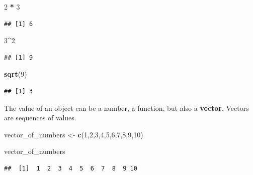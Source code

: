 \documentclass[
]{article}
\newenvironment{Shaded}{\begin{snugshade}}{\end{snugshade}}
\newcommand{\DecValTok}[1]{\textcolor[rgb]{0.00,0.00,0.81}{#1}}
\newcommand{\KeywordTok}[1]{\textcolor[rgb]{0.13,0.29,0.53}{\textbf{#1}}}
\newcommand{\NormalTok}[1]{#1}
\newcommand{\OperatorTok}[1]{\textcolor[rgb]{0.81,0.36,0.00}{\textbf{#1}}}
\newcommand{\StringTok}[1]{\textcolor[rgb]{0.31,0.60,0.02}{#1}}
\begin{document}
\begin{Shaded}
\begin{Highlighting}[]
\DecValTok{2} \OperatorTok{*}\StringTok{ }\DecValTok{3}
\end{Highlighting}
\end{Shaded}

\begin{verbatim}
## [1] 6
\end{verbatim}

\begin{Shaded}
\begin{Highlighting}[]
\DecValTok{3}\OperatorTok{^}\DecValTok{2}
\end{Highlighting}
\end{Shaded}

\begin{verbatim}
## [1] 9
\end{verbatim}

\begin{Shaded}
\begin{Highlighting}[]
\KeywordTok{sqrt}\NormalTok{(}\DecValTok{9}\NormalTok{)}
\end{Highlighting}
\end{Shaded}

\begin{verbatim}
## [1] 3
\end{verbatim}

The value of an object can be a number, a function, but also a \textbf{vector}.
Vectors are sequences of values.

\begin{Shaded}
\begin{Highlighting}[]
\NormalTok{vector_of_numbers <-}\StringTok{ }\KeywordTok{c}\NormalTok{(}\DecValTok{1}\NormalTok{,}\DecValTok{2}\NormalTok{,}\DecValTok{3}\NormalTok{,}\DecValTok{4}\NormalTok{,}\DecValTok{5}\NormalTok{,}\DecValTok{6}\NormalTok{,}\DecValTok{7}\NormalTok{,}\DecValTok{8}\NormalTok{,}\DecValTok{9}\NormalTok{,}\DecValTok{10}\NormalTok{) }
\end{Highlighting}
\end{Shaded}

\begin{Shaded}
\begin{Highlighting}[]
\NormalTok{vector_of_numbers}
\end{Highlighting}
\end{Shaded}

\begin{verbatim}
##  [1]  1  2  3  4  5  6  7  8  9 10
\end{verbatim}
\end{document}
